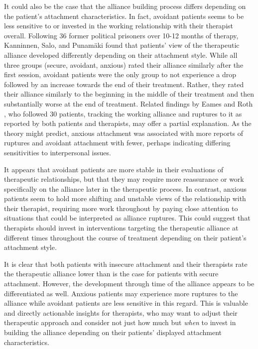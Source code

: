 \documentclass[12pt]{report}
\begin{document}
It could also be the case that the alliance building process differs depending on the patient's attachment characteristics.
In fact, avoidant patients seems to be less sensitive to or invested in the working relationship with their therapist overall. Following 36 former political prisoners over 10-12 months of therapy, Kanninnen, Salo, and Punamäki \citeyear{Kanninen2000} found that patients' view of the therapeutic alliance developed differently depending on their attachment style.
While all three groups (secure, avoidant, anxious) rated their alliance similarly after the first session, avoidant patients were the only group to not experience a drop followed by an increase towards the end of their treatment.
Rather, they rated their alliance similarly to the beginning in the middle of their treatment and then substantially worse at the end of treatment.
Related findings by Eames and Roth \citeyear{Eames2000}, who followed 30 patients, tracking the working alliance and ruptures to it as reported by both patients and therapists, may offer a partial explanation.
As the theory might predict, anxious attachment was associated with more reports of ruptures and avoidant attachment with fewer, perhaps indicating differing sensitivities to interpersonal issues.

It appears that avoidant patients are more stable in their evaluations of therapeutic relationships, but that they may require more reassurance or work specifically on the alliance later in the therapeutic process.
In contrast, anxious patients seem to hold more shifting and unstable views of the relationship with their therapist, requiring more work throughout by paying close attention to situations that could be interpreted as alliance ruptures.
This could suggest that therapists should invest in interventions targeting the therapeutic alliance at different times throughout the course of treatment depending on their patient's attachment style.

It is clear that both patients with insecure attachment and their therapists rate the therapeutic alliance lower than is the case for patients with secure attachment.
However, the development through time of the alliance appears to be differentiated as well. Anxious patients may experience more ruptures to the alliance while avoidant patients are less sensitive in this regard.
This is valuable and directly actionable insights for therapists, who may want to adjust their therapeutic approach and consider not just how much but \textit{when} to invest in building the alliance depending on their patients' displayed attachment characteristics.
\end{document}
